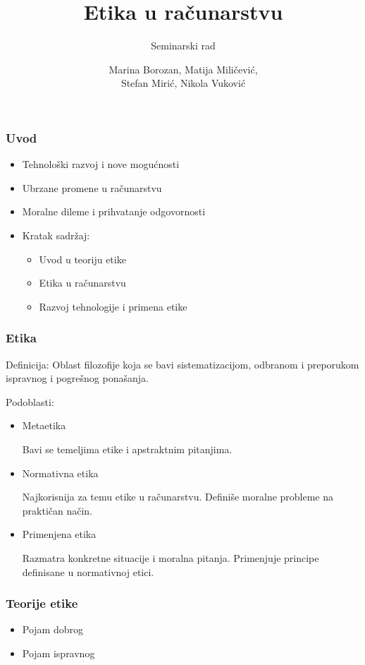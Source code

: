 \documentclass[pdf]{beamer}
\title{Etika u računarstvu}
\subtitle{Seminarski rad}%
\author{Marina Borozan, Matija Miličević,\\
	Stefan Mirić, Nikola Vuković\\}
\begin{document}
\begin{frame}
	\titlepage
	\end{frame}


\begin{frame}
\frametitle{Uvod}

\begin{itemize}
\item{Tehnološki razvoj i nove mogućnosti}
\item{Ubrzane promene u računarstvu}
\item{Moralne dileme i prihvatanje odgovornosti}
\item{Kratak sadržaj:}
	\begin{itemize}
	\item{Uvod u teoriju etike}
	\item{Etika u računarstvu}
	\item{Razvoj tehnologije i primena etike}
	\end{itemize}
\end{itemize}

\end{frame}

\begin{frame}
\frametitle{Etika}

Definicija: Oblast filozofije koja se bavi sistematizacijom, odbranom i preporukom ispravnog i pogrešnog ponašanja.

Podoblasti:
\begin{itemize}
\item{Metaetika

	Bavi se temeljima etike i apstraktnim pitanjima.}
\item{Normativna etika

	Najkorisnija za temu etike u računarstvu. Definiše moralne probleme na praktičan način.}
\item{Primenjena etika
	
	Razmatra konkretne situacije i moralna pitanja. Primenjuje principe definisane u normativnoj etici.}
\end{itemize}

\end{frame}

\begin{frame}
\frametitle{Teorije etike}

\begin{itemize}
\item{Pojam dobrog}
\item{Pojam ispravnog}
\end{itemize}


\end{frame}
\end{document}
